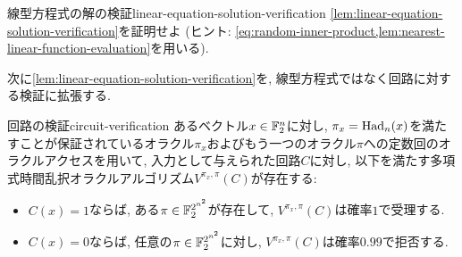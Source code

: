   \begin{exercise}{線型方程式の解の検証}{linear-equation-solution-verification}
    \cref{lem:linear-equation-solution-verification}を証明せよ (ヒント: \cref{eq:random-inner-product,lem:nearest-linear-function-evaluation}を用いる).
  \end{exercise}
  
  次に\cref{lem:linear-equation-solution-verification}を, 線型方程式ではなく回路に対する検証に拡張する.
  \begin{lemma}{回路の検証}{circuit-verification}
    あるベクトル$x\in\mathbb{F}_2^n$に対し, $\pi_x=\mathrm{Had}_n(x)$を満たすことが保証されているオラクル$\pi_x$およびもう一つのオラクル$\pi$への定数回のオラクルアクセスを用いて, 入力として与えられた回路$C$に対し, 
    以下を満たす多項式時間乱択オラクルアルゴリズム$V^{\pi_x,\pi}(C)$が存在する:
    \begin{itemize}
      \item $C(x)=1$ならば, ある$\pi\in \mathbb{F}_2^{2^{n^2}}$が存在して, $V^{\pi_x,\pi}(C)$は確率$1$で受理する.
      \item $C(x)=0$ならば, 任意の$\pi\in \mathbb{F}_2^{2^{n^2}}$に対し, $V^{\pi_x,\pi}(C)$は確率$0.99$で拒否する.
    \end{itemize}
  \end{lemma}

